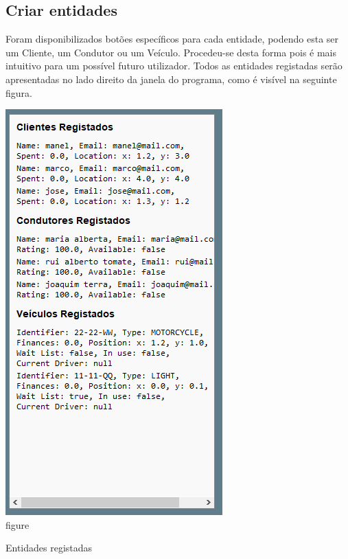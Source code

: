 \documentclass[a4paper]{article}
\begin{document}
\label{sec:manual}

\subsection{Criar entidades}
Foram disponibilizados botões específicos para cada entidade, podendo esta ser um Cliente, um Condutor ou um Veículo. Procedeu-se desta forma pois é mais intuitivo para um possível futuro utilizador. Todos as entidades registadas serão apresentadas no lado direito da janela do programa, como é visível na seguinte figura.
\begin{center}
  \includegraphics[scale=0.70]{janela_registados}\\
  \caption{figure}{Entidades registadas}
  \label{fig:picture}
\end{center}
\end{document}
